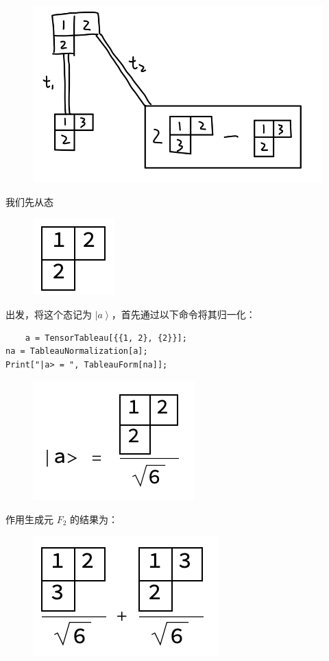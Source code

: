 \documentclass[UTF8]{ctexart}
\begin{document}
\begin{figure}[H]
\begin{centering}
\includegraphics[width=0.4\linewidth]{include/T4}
\par\end{centering}
\end{figure}

\noindent 我们先从态

\begin{figure}[H]
\begin{centering}
\includegraphics[width=0.1\linewidth]{include/Y4}
\par\end{centering}
\end{figure}

\noindent 出发，将这个态记为 $\left| a \right \rangle$，首先通过以下命令将其归一化：
\begin{verbatim}
	a = TensorTableau[{{1, 2}, {2}}];
na = TableauNormalization[a];
Print["|a> = ", TableauForm[na]];
\end{verbatim}

\begin{figure}[H]
\begin{centering}
\includegraphics[width=0.25\linewidth]{include/O5}
\par\end{centering}
\end{figure}

\noindent 作用生成元 $F_2$ 的结果为：

\begin{figure}[H]
\begin{centering}
\includegraphics[width=0.25\linewidth]{include/O6}
\par\end{centering}
\end{figure}
\end{document}
